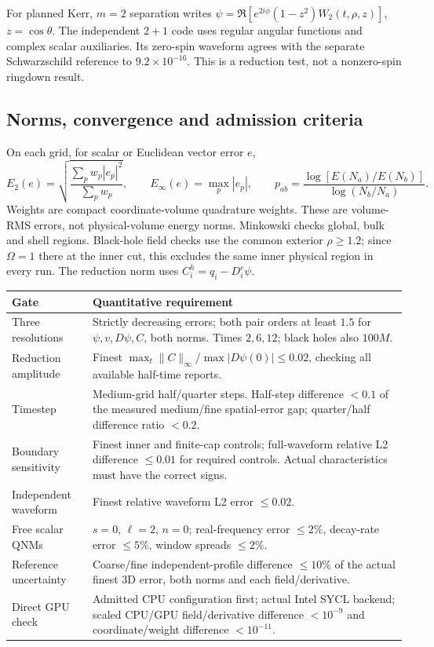 \documentclass[11pt,letterpaper]{article}
\begin{document}
For planned Kerr, $m=2$ separation writes $\psi=\Re[e^{2i\phi}(1-z^2)W_2(t,\rho,z)]$, $z=\cos\theta$. The independent $2+1$ code uses regular angular functions and complex scalar auxiliaries. Its zero-spin waveform agrees with the separate Schwarzschild reference to $9.2\times10^{-16}$. This is a reduction test, not a nonzero-spin ringdown result.

\clearpage
\subsection{Norms, convergence and admission criteria}
On each grid, for scalar or Euclidean vector error $e$,
\begin{equation}
 E_2(e)=\sqrt{\frac{\sum_p w_p|e_p|^2}{\sum_p w_p}},\qquad
 E_\infty(e)=\max_p|e_p|,\qquad
 p_{ab}=\frac{\log[E(N_a)/E(N_b)]}{\log(N_b/N_a)}.
\end{equation}
Weights are compact coordinate-volume quadrature weights. These are volume-RMS errors, not physical-volume energy norms. Minkowski checks global, bulk and shell regions. Black-hole field checks use the common exterior $\rho\geq1.2$; since $\Omega=1$ there at the inner cut, this excludes the same inner physical region in every run. The reduction norm uses $C_i^h=q_i-D_i^c\psi$.

\begin{center}\small
\begin{tabularx}{\linewidth}{@{}p{3.2cm}X@{}}\toprule
Gate & Quantitative requirement \\\midrule
Three resolutions & Strictly decreasing errors; both pair orders at least $1.5$ for $\psi,v,D\psi,C$, both norms. Times $2,6,12$; black holes also $100M$. \\
Reduction amplitude & Finest $\max_t\|C\|_\infty/\max|D\psi(0)|\leq0.02$, checking all available half-time reports. \\
Timestep & Medium-grid half/quarter steps. Half-step difference $<0.1$ of the measured medium/fine spatial-error gap; quarter/half difference ratio $<0.2$. \\
Boundary sensitivity & Finest inner and finite-cap controls; full-waveform relative L2 difference $\leq0.01$ for required controls. Actual characteristics must have the correct signs. \\
Independent waveform & Finest relative waveform L2 error $\leq0.02$. \\
Free scalar QNMs & $s=0$, $\ell=2$, $n=0$; real-frequency error $\leq2\%$, decay-rate error $\leq5\%$, window spreads $\leq2\%$. \\
Reference uncertainty & Coarse/fine independent-profile difference $\leq10\%$ of the actual finest 3D error, both norms and each field/derivative. \\
Direct GPU check & Admitted CPU configuration first; actual Intel SYCL backend; scaled CPU/GPU field/derivative difference $<10^{-9}$ and coordinate/weight difference $<10^{-11}$. \\\bottomrule
\end{tabularx}
\end{center}
\end{document}

